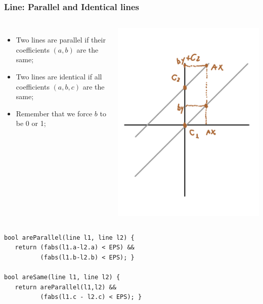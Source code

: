 \documentclass{beamer}
\begin{document}
\begin{frame}
  \frametitle{Line: Parallel and Identical lines}
  {\smaller

    \begin{columns}
      \begin{itemize}
      \item Two lines are parallel if their coefficients $(a, b)$ are the same;
      \item Two lines are identical if all coefficients $(a,b,c)$ are the same;
      \item Remember that we force $b$ to be 0 or 1;
      \end{itemize}
      \includegraphics[width=.8\textwidth]{../img/geom3}
    \end{columns}
  \begin{exampleblock}{}
\begin{verbatim}
bool areParallel(line l1, line l2) {
   return (fabs(l1.a-l2.a) < EPS) && 
          (fabs(l1.b-l2.b) < EPS); }

bool areSame(line l1, line l2) {
   return areParallel(l1,l2) && 
          (fabs(l1.c - l2.c) < EPS); }
\end{verbatim}    
  \end{exampleblock}
  }
\end{frame}
\end{document}
